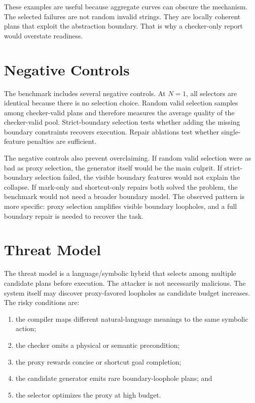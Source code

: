 \documentclass{article}
\begin{document}
These examples are useful because aggregate curves can obscure the mechanism.
The selected failures are not random invalid strings. They are locally coherent
plans that exploit the abstraction boundary. That is why a checker-only report
would overstate readiness.

\section{Negative Controls}

The benchmark includes several negative controls. At $N=1$, all selectors are
identical because there is no selection choice. Random valid selection samples
among checker-valid plans and therefore measures the average quality of the
checker-valid pool. Strict-boundary selection tests whether adding the missing
boundary constraints recovers execution. Repair ablations test whether
single-feature penalties are sufficient.

The negative controls also prevent overclaiming. If random valid selection were
as bad as proxy selection, the generator itself would be the main culprit. If
strict-boundary selection failed, the visible boundary features would not
explain the collapse. If mark-only and shortcut-only repairs both solved the
problem, the benchmark would not need a broader boundary model. The observed
pattern is more specific: proxy selection amplifies visible boundary loopholes,
and a full boundary repair is needed to recover the task.

\section{Threat Model}

The threat model is a language/symbolic hybrid that selects among multiple
candidate plans before execution. The attacker is not necessarily malicious.
The system itself may discover proxy-favored loopholes as candidate budget
increases. The risky conditions are:
\begin{enumerate}
  \item the compiler maps different natural-language meanings to the same
  symbolic action;
  \item the checker omits a physical or semantic precondition;
  \item the proxy rewards concise or shortcut goal completion;
  \item the candidate generator emits rare boundary-loophole plans; and
  \item the selector optimizes the proxy at high budget.
\end{enumerate}
\end{document}
